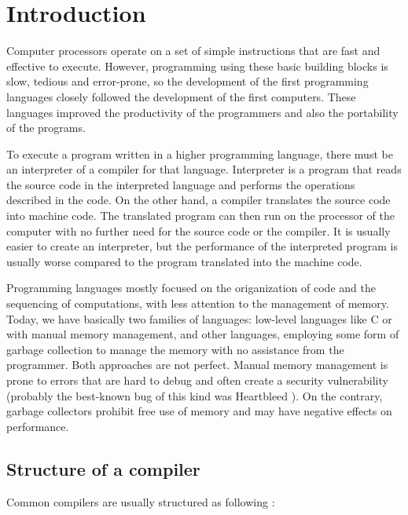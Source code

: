 \chapter{Introduction}

Computer processors operate on a set of simple instructions that are fast and
effective to execute. However, programming using these basic building blocks is
slow, tedious and error-prone, so the development of the first programming
languages closely followed the development of the first computers. These
languages improved the productivity of the programmers and also the portability
of the programs.

To execute a program written in a higher programming language, there must be an
interpreter of a compiler for that language. Interpreter is a program that reads
the source code in the interpreted language and performs the operations
described in the code. On the other hand, a compiler translates the source code
into machine code. The translated program can then run on the processor of the
computer with no further need for the source code or the compiler. It is usually
easier to create an interpreter, but the performance of the interpreted program
is usually worse compared to the program translated into the machine code.

Programming languages mostly focused on the origanization of code and the
sequencing of computations, with less attention to the management of memory.
Today, we have basically two families of languages: low-level languages like C
or \Cplusplus with manual memory management, and other languages, employing
some form of garbage collection to manage the memory with no assistance from the
programmer. Both approaches are not perfect. Manual memory management is prone
to errors that are hard to debug and often create a security vulnerability
(probably the best-known bug of this kind was Heartbleed \cite{heartbleed}).
On the contrary, garbage collectors prohibit free use of memory and may have
negative effects on performance.

\section{Structure of a compiler}

Common compilers are usually structured as following
\cite{grune2012modern,appel1998modern}:

